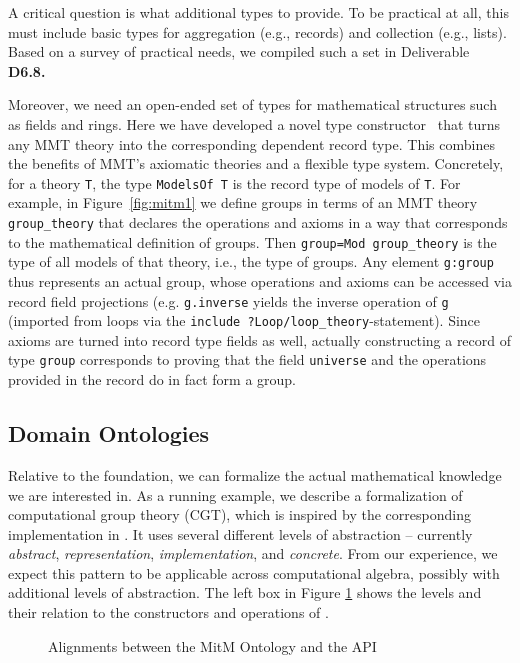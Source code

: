 A critical question is what additional types to provide.
To be practical at all, this must include basic types for aggregation (e.g., records) and collection (e.g., lists).
Based on a survey of practical needs, we compiled such a set in Deliverable \textbf{D6.8.}~\cite{ODK-D6.8,}

Moreover, we need an open-ended set of types for mathematical structures such as fields and rings.
Here we have developed a novel type constructor~\cite{MueRabKoh:tat18} that turns any MMT theory into the corresponding dependent record type.
This combines the benefits of MMT's axiomatic theories and a flexible type system.
Concretely, for a theory \lstinline|T|, the type \lstinline|ModelsOf T| is the record type of models of \lstinline|T|.
For example, in Figure~\ref{fig:mitm1} we define groups in terms of an MMT theory \lstinline|group_theory| that declares the operations and axioms in a way that corresponds to the mathematical definition of groups.
Then \lstinline|group=Mod group_theory| is the type of all models of that theory, i.e., the type of groups.
Any element \lstinline|g:group| thus represents an actual group, whose operations and axioms can be accessed via record field projections (e.g. \lstinline|g.inverse| yields the inverse operation of \lstinline|g| (imported from loops via the \lstinline|include ?Loop/loop_theory|-statement).
Since axioms are turned into record type fields as well, actually constructing a record of type \lstinline|group| corresponds to proving that the field \lstinline|universe| and the operations provided in the record do in fact form a group.

\subsection{Domain Ontologies}

Relative to the foundation, we can formalize the actual mathematical knowledge we are interested in.
As a running example, we describe a formalization of computational group theory (CGT), which is inspired by the corresponding implementation in \GAP.
It uses several different levels of abstraction -- currently \emph{abstract}, \emph{representation}, \emph{implementation}, and \emph{concrete}.
From our experience, we expect this pattern to be applicable across computational algebra, possibly with additional levels of abstraction. 
The left box in Figure \ref{fig:cgtontology} shows the levels and their relation to the constructors and operations of \GAP.

\begin{figure}[ht]\centering
  \caption{Alignments between the MitM Ontology and the \GAP API}\label{fig:cgtontology}
\end{figure}

